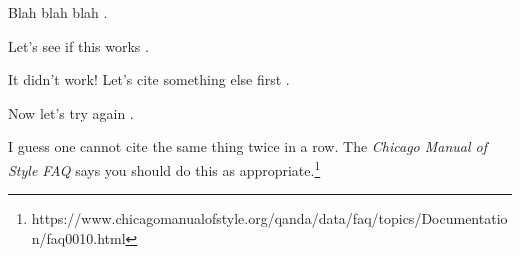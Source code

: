\documentclass{article}
\begin{document}
Blah blah blah \citep{CharnessDufwenberg2006}.

Let's see if this works \citep[\textit{c.f.},][]{CharnessDufwenberg2006}.

It didn't work! Let's cite something else first \citep{BeattieLoomes1997}.

Now let's try again \citep[\textit{c.f.},][]{CharnessDufwenberg2006}.

I guess one cannot cite the same thing twice in a row. The \emph{Chicago Manual of Style FAQ} says you should do this as appropriate.\footnote{https://www.chicagomanualofstyle.org/qanda/data/faq/topics/Documentation/faq0010.html}
\end{document}
